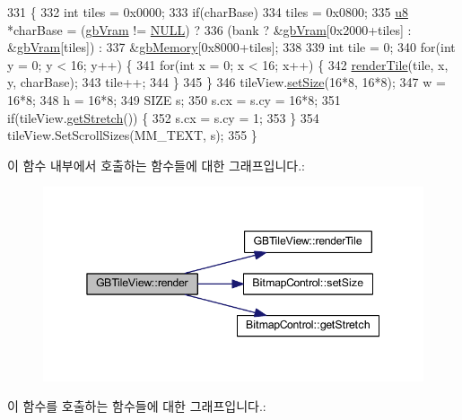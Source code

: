 \begin{DoxyCode}
331 \{
332   \textcolor{keywordtype}{int} tiles = 0x0000;
333   \textcolor{keywordflow}{if}(charBase)
334     tiles = 0x0800;
335   \mbox{\hyperlink{_system_8h_aed742c436da53c1080638ce6ef7d13de}{u8}} *charBase = (\mbox{\hyperlink{gb_globals_8cpp_acc4cae98f0f9473610870333741081e9}{gbVram}} != \mbox{\hyperlink{getopt1_8c_a070d2ce7b6bb7e5c05602aa8c308d0c4}{NULL}}) ?
336     (bank ? &\mbox{\hyperlink{gb_globals_8cpp_acc4cae98f0f9473610870333741081e9}{gbVram}}[0x2000+tiles] : &\mbox{\hyperlink{gb_globals_8cpp_acc4cae98f0f9473610870333741081e9}{gbVram}}[tiles]) :
337     &\mbox{\hyperlink{gb_globals_8cpp_a43f07d3a5fcb2301e2662188e888c5a1}{gbMemory}}[0x8000+tiles];
338  
339   \textcolor{keywordtype}{int} tile = 0;
340   \textcolor{keywordflow}{for}(\textcolor{keywordtype}{int} y = 0; y < 16; y++) \{
341     \textcolor{keywordflow}{for}(\textcolor{keywordtype}{int} x = 0; x < 16; x++) \{
342       \mbox{\hyperlink{class_g_b_tile_view_ade04081b3b047c110f6ae5673c7154ee}{renderTile}}(tile, x, y, charBase);
343       tile++;
344     \}
345   \}
346   tileView.\mbox{\hyperlink{class_bitmap_control_a421004fe6ba01329dd69259396592d1f}{setSize}}(16*8, 16*8);
347   w = 16*8;
348   h = 16*8;
349   SIZE s;
350   s.cx = s.cy = 16*8;
351   \textcolor{keywordflow}{if}(tileView.\mbox{\hyperlink{class_bitmap_control_a1d3cff9a3b57dd7558d678177dcf4b5c}{getStretch}}()) \{
352     s.cx = s.cy = 1;
353   \}
354   tileView.SetScrollSizes(MM\_TEXT, s);
355 \}
\end{DoxyCode}
이 함수 내부에서 호출하는 함수들에 대한 그래프입니다.\+:
\nopagebreak
\begin{figure}[H]
\begin{center}
\leavevmode
\includegraphics[width=345pt]{class_g_b_tile_view_a1012b77fed7304d7b27b9d619472e6a7_cgraph}
\end{center}
\end{figure}
이 함수를 호출하는 함수들에 대한 그래프입니다.\+:
